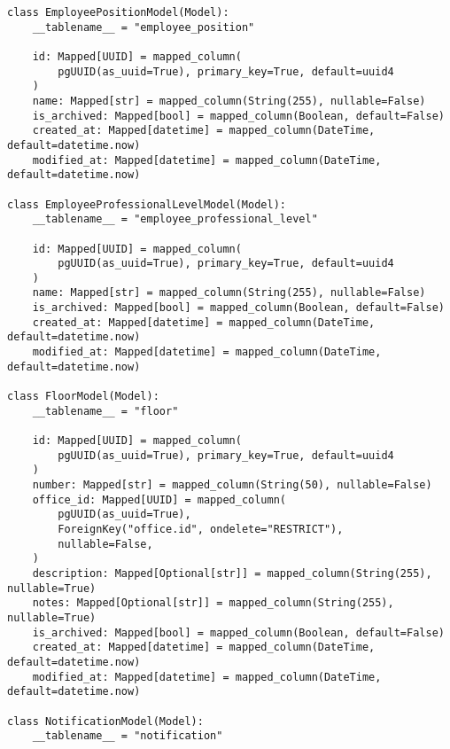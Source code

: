 \begin{lstlisting}[style=pythonstyle]
class EmployeePositionModel(Model):
    __tablename__ = "employee_position"

    id: Mapped[UUID] = mapped_column(
        pgUUID(as_uuid=True), primary_key=True, default=uuid4
    )
    name: Mapped[str] = mapped_column(String(255), nullable=False)
    is_archived: Mapped[bool] = mapped_column(Boolean, default=False)
    created_at: Mapped[datetime] = mapped_column(DateTime, default=datetime.now)
    modified_at: Mapped[datetime] = mapped_column(DateTime, default=datetime.now)

class EmployeeProfessionalLevelModel(Model):
    __tablename__ = "employee_professional_level"

    id: Mapped[UUID] = mapped_column(
        pgUUID(as_uuid=True), primary_key=True, default=uuid4
    )
    name: Mapped[str] = mapped_column(String(255), nullable=False)
    is_archived: Mapped[bool] = mapped_column(Boolean, default=False)
    created_at: Mapped[datetime] = mapped_column(DateTime, default=datetime.now)
    modified_at: Mapped[datetime] = mapped_column(DateTime, default=datetime.now)

class FloorModel(Model):
    __tablename__ = "floor"

    id: Mapped[UUID] = mapped_column(
        pgUUID(as_uuid=True), primary_key=True, default=uuid4
    )
    number: Mapped[str] = mapped_column(String(50), nullable=False)
    office_id: Mapped[UUID] = mapped_column(
        pgUUID(as_uuid=True),
        ForeignKey("office.id", ondelete="RESTRICT"),
        nullable=False,
    )
    description: Mapped[Optional[str]] = mapped_column(String(255), nullable=True)
    notes: Mapped[Optional[str]] = mapped_column(String(255), nullable=True)
    is_archived: Mapped[bool] = mapped_column(Boolean, default=False)
    created_at: Mapped[datetime] = mapped_column(DateTime, default=datetime.now)
    modified_at: Mapped[datetime] = mapped_column(DateTime, default=datetime.now)

class NotificationModel(Model):
    __tablename__ = "notification"


\end{lstlisting}

